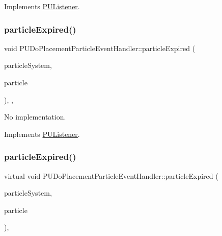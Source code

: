 Implements \hyperlink{classPUListener}{P\+U\+Listener}.

\mbox{\label{classPUDoPlacementParticleEventHandler_acd3d0a8e03aa705f6f1844065a7a04e7}} 
\subsubsection{\texorpdfstring{particle\+Expired()}{particleExpired()}\hspace{0.1cm}{\footnotesize\ttfamily [1/2]}}
{\footnotesize\ttfamily void P\+U\+Do\+Placement\+Particle\+Event\+Handler\+::particle\+Expired (\begin{DoxyParamCaption}\item[{\hyperlink{classPUParticleSystem3D}{P\+U\+Particle\+System3D} $\ast$}]{particle\+System,  }\item[{\hyperlink{structPUParticle3D}{P\+U\+Particle3D} $\ast$}]{particle }\end{DoxyParamCaption})\hspace{0.3cm}{\ttfamily [inline]}, {\ttfamily [override]}, {\ttfamily [virtual]}}

No implementation. 

Implements \hyperlink{classPUListener}{P\+U\+Listener}.

\mbox{\label{classPUDoPlacementParticleEventHandler_a4b6fac6b01871783eff57086e875b531}} 
\subsubsection{\texorpdfstring{particle\+Expired()}{particleExpired()}\hspace{0.1cm}{\footnotesize\ttfamily [2/2]}}
{\footnotesize\ttfamily virtual void P\+U\+Do\+Placement\+Particle\+Event\+Handler\+::particle\+Expired (\begin{DoxyParamCaption}\item[{\hyperlink{classPUParticleSystem3D}{P\+U\+Particle\+System3D} $\ast$}]{particle\+System,  }\item[{\hyperlink{structPUParticle3D}{P\+U\+Particle3D} $\ast$}]{particle }\end{DoxyParamCaption})\hspace{0.3cm}{\ttfamily [override]}, {\ttfamily [virtual]}}

